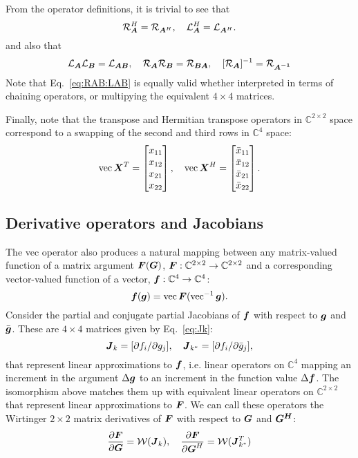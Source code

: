 \documentclass[useAMS,usenatbib]{mn2e}
\makeatletter
\newcommand{\COMPLEX}{\mathbb{C}}
\newcommand{\mat}[1]{{\bmath{#1}}}
\newcommand{\JJ}{\mat{J}} %
\newcommand{\Matrix}[2]{\left [ \begin{array}{@{}#1@{}}#2\end{array} \right ]}
\newcommand{\Rop}[1]{\mathcal{R}_{{#1}}}
\newcommand{\Lop}[1]{\mathcal{L}_{{#1}}}
\numberwithin{equation}{section} %
\makeatother
\begin{document}
{From the operator definitions, it is trivial to see that
\begin{equation}
\label{eq:RH:LH}
\Rop{\mat{A}}^H = \Rop{\mat{A}^H},~~~\Lop{\mat{A}}^H = \Lop{\mat{A}^H}.
\end{equation}
and also that
\begin{equation}
\label{eq:RAB:LAB}
\Lop{\mat{A}}\Lop{\mat{B}} = \Lop{\mat{AB}},~~~\Rop{\mat{A}}\Rop{\mat{B}} = \Rop{\mat{BA}},~~~[\Rop{\mat{A}}]^{-1} = \Rop{\mat{A^{-1}}}
\end{equation}
Note that Eq.~\ref{eq:RAB:LAB} is equally valid whether interpreted in terms of chaining operators, or multipying 
the equivalent $4\times4$ matrices.

Finally, note that the transpose and Hermitian transpose operators in $\COMPLEX^{2\times2}$ space correspond to a swapping
of the second and third rows in $\COMPLEX^4$ space:
\begin{equation}
\label{eq:vec:XH}
\VEC{\mat{X}^T} = \Matrix{c}{x_{11}\\x_{12}\\x_{21}\\x_{22}},~~~
\VEC{\mat{X}^H} = \Matrix{c}{\bar{x}_{11}\\\bar{x}_{12}\\\bar{x}_{21}\\\bar{x}_{22}}.
\end{equation}

\subsection{Derivative operators and Jacobians}

The vec operator also produces a natural mapping between any matrix-valued function of a 
matrix argument $\mat{F}(\mat{G})$, $\mat{F}:\COMPLEX^{2\times2}\to\COMPLEX^{2\times2}$ and a corresponding 
vector-valued function of a vector, $\bmath{f}:\COMPLEX^4\to\COMPLEX^4$:
\begin{equation}
\bmath{f}(\bmath{g}) = \VEC{\mat{F}(\VECINV{\bmath{g}})}.
\end{equation}
Consider the partial and conjugate partial Jacobians of $\bmath{f}$ with respect to $\bmath{g}$ 
and $\bar{\bmath{g}}$. These are $4\times4$ matrices given by Eq.~\ref{eq:Jk}:
\begin{equation}
\label{eq:Jk-fg}
\JJ_k = [ \partial f_i / \partial g_j ],~~~\JJ_{k^*} = [ \partial f_i / \partial \bar{g}_j ],
\end{equation}
that represent linear approximations to $\bmath{f}$, i.e. linear operators on $\COMPLEX^4$ 
mapping an increment in the argument $\Delta\bmath{g}$ to an increment in the function value $\Delta\bmath{f}$. 
The isomorphism above matches them up with equivalent linear operators on $\COMPLEX^{2\times2}$ that represent
linear approximations to $\bmath{F}$. We can call these operators the Wirtinger $2\times2$ matrix derivatives 
of $\mat{F}$ with respect to $\mat{G}$ and $\mat{G^H}$:
\begin{equation}
\label{eq:def:dF:dG}
\frac{\partial\mat{F}}{\partial{\mat{G}}} = \mathcal{W}(\JJ_k),~~~
\frac{\partial\mat{F}}{\partial{\mat{G}^H}} = \mathcal{W}(\JJ_{k^*}^T)
\end{equation}

}
\end{document}
